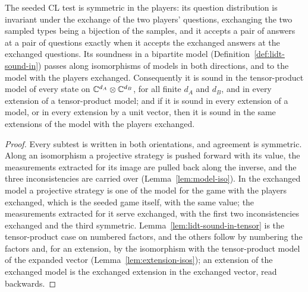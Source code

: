 \begin{lemma}
\label{lem:lidt-model-transport}
\leanok
The seeded CL test is symmetric in the players: its question distribution is invariant under the
exchange of the two players' questions, exchanging the two sampled types being a bijection of the
samples, and it accepts a pair of answers at a pair of questions exactly when it accepts the
exchanged answers at the exchanged questions. Its soundness in a bipartite model
(Definition~\ref{def:lidt-sound-in}) passes along isomorphisms of models in both directions, and to
the model with the players exchanged. Consequently it is sound in the tensor-product model of every
state on $\mathbb{C}^{d_A} \otimes \mathbb{C}^{d_B}$, for all finite $d_A$ and $d_B$, and in every extension of a
tensor-product model; and if it is sound in every extension of a model, or in every extension by a
unit vector, then it is sound in the same extensions of the model with the players exchanged.
\end{lemma}

\begin{proof}
\leanok
Every subtest is written in both orientations, and agreement is symmetric. Along an isomorphism a
projective strategy is pushed forward with its value, the measurements extracted for its image are
pulled back along the inverse, and the three inconsistencies are carried over
(Lemma~\ref{lem:model-iso}). In the exchanged model a projective strategy is one of the model for
the game with the players exchanged, which is the seeded game itself, with the same value; the
measurements extracted for it serve exchanged, with the first two inconsistencies exchanged and the
third symmetric. Lemma~\ref{lem:lidt-sound-in-tensor} is the tensor-product case on numbered
factors, and the others follow by numbering the factors and, for an extension, by the isomorphism
with the tensor-product model of the expanded vector (Lemma~\ref{lem:extension-isos}); an extension
of the exchanged model is the exchanged extension in the exchanged vector, read backwards.
\end{proof}

